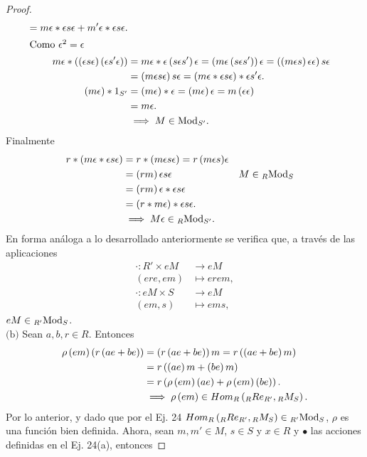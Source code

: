 \documentclass{article}
\newcommand{\lrprth}[1]{
	\left(#1\right)
}
\newcommand{\descapp}[6]{
	#1: #2 &\rightarrow #3\\
	#4 &\mapsto #5#6 
}
\newcommand{\ringmod}[3]{
	\if#3l
	{}_{#1}#2
	\else
	\if#3r
	#2_{#1}
	\fi
	\fi
}
\newcommand{\ringbimod}[4]{
	\if#4l
	{}_{#1-#2}#3
	\else
	\if#4r
	#3_{#1-#2}
	\else 
	\ifstrequal{#4}{lr}{
		{}_{#1}#3_{#2}
	}
	\fi
	\fi
}
\newcommand{\ringmodhom}[3]{
	Hom_{#1}\lrprth{#2,#3}
}
\theoremstyle{definition}
\theoremstyle{plain}
\theoremstyle{plain}
\theoremstyle{definition}
\theoremstyle{definition}
\theoremstyle{definition}
\theoremstyle{definition}
\theoremstyle{definition}
\theoremstyle{definition}
\begin{document}
\begin{enumerate}[label=\textbf{Ej \arabic*.}]
\begin{proof}
\begin{align*}
		=m\epsilon*{\epsilon s\epsilon}+m'\epsilon*{\epsilon s\epsilon}.\\
		\intertext{Como $\epsilon^2=\epsilon$}
		{m\epsilon}*\lrprth{\lrprth{\epsilon s\epsilon}\lrprth{\epsilon s'\epsilon}}&={m\epsilon}*\epsilon \lrprth{s\epsilon s'}\epsilon=\lrprth{m\epsilon\lrprth{s\epsilon s'}}\epsilon=\lrprth{\lrprth{m\epsilon s}\epsilon\epsilon}s\epsilon\\
		&=\lrprth{m\epsilon s\epsilon}s\epsilon=\lrprth{m\epsilon*\epsilon s\epsilon}*\epsilon s'\epsilon.\\
		\lrprth{m\epsilon}*1_{S'}&=\lrprth{m\epsilon}*\epsilon=\lrprth{m\epsilon}\epsilon=m\lrprth{\epsilon\epsilon}\\&=m\epsilon.\\
		&\implies M\in\ringmod{S'}{\text{Mod}}{r}.\\		
	\end{align*}
	Finalmente
\begin{align*}
		{r*\lrprth{{m\epsilon}*{\epsilon s\epsilon}}}&=r*\lrprth{{m\epsilon s}\epsilon}={r\lrprth{m\epsilon s}}\epsilon\\
	&={\lrprth{rm}\epsilon s}\epsilon && M\in\ringbimod{R}{S}{\text{Mod}}{lr}\\
	&={\lrprth{rm}\epsilon}*{\epsilon s\epsilon}\\
	&=\lrprth{r*{m\epsilon}}*{\epsilon s\epsilon}.\\
	&\implies M\epsilon\in\ringbimod{R}{S'}{\text{Mod}}{lr}.
\end{align*}
	En forma análoga a lo desarrollado anteriormente se verifica que, a través de las aplicaciones
	\begin{align*}
		\descapp{\cdot}{R'\times eM}{eM}{(ere,em)}{e{rem}}{,}\\
		\descapp{\cdot}{eM\times S}{eM}{(em,s)}{e{ms}}{,}
	\end{align*}
	$eM\in\ringbimod{R'}{S}{\text{Mod}}{lr}$.\\
	$\boxed{\text{(b)}}$ Sean $a,b,r\in R$. Entonces
	\begin{align*}
		{\rho\lrprth{em}}\lrprth{r\lrprth{ae+be}}&=\lrprth{r\lrprth{ae+be}}m=r\lrprth{\lrprth{ae+be}m}\\
		&=r\lrprth{\lrprth{ae}m+\lrprth{be}m}\\
		&=r\lrprth{\rho\lrprth{em}(ae)+\rho\lrprth{em}(be)}.\\
		&\implies \rho\lrprth{em}\in\ringmodhom{R}{\ringbimod{R}{R'}{Re}{lr}}{\ringbimod{R}{S}{M}{lr}}.
	\end{align*}
	Por lo anterior, y dado que por el Ej. 24  $\ringmodhom{R}{\ringbimod{R}{R'}{Re}{lr}}{\ringbimod{R}{S}{M}{lr}}\in\ringbimod{R'}{S}{\text{Mod}}{lr}$, $\rho$ es una función bien definida. Ahora, sean $m,m'\in M$, $s\in S$ y $x\in R$ y $\bullet$ las acciones definidas en el Ej. 24(a), entonces 

\end{proof}
\end{enumerate}
\end{document}

